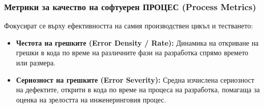 \documentclass{scrartcl}
\begin{document}
\begin{FlushLeft}
\subsubsection{Метрики за качество на софтуерен ПРОЦЕС (Process Metrics)}
Фокусират се върху ефективността на самия производствен цикъл и тестването:
\begin{itemize}
    \item \textbf{Честота на грешките (Error Density / Rate):} Динамика на откриване на грешки в кода по време на различните фази на разработка спрямо времето или размера.
    \item \textbf{Сериозност на грешките (Error Severity):} Средна изчислена сериозност на дефектите, открити в кода по време на процеса на разработка, помагаща за оценка на зрелостта на инженеринговия процес.
\end{itemize}

\end{FlushLeft}
\end{document}
